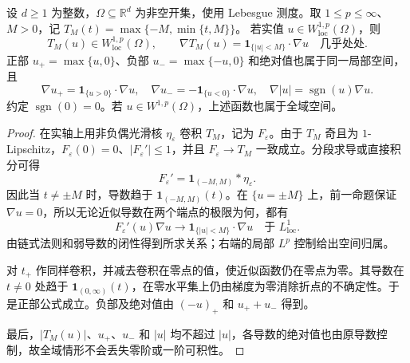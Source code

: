 \begin{proposition}\label{b1:prop:sobolev-truncation}
设 \(d\geq1\) 为整数，\(\Omega\subseteq\mathbb R^d\) 为非空开集，使用 Lebesgue 测度。取 \(1\leq p\leq\infty\)、\(M>0\)，记 \(T_M(t)=\max\{-M,\min\{t,M\}\}\)。
若实值 \(u\in W^{1,p}_{\mathrm{loc}}(\Omega)\)，则
\[
 T_M(u)\in W^{1,p}_{\mathrm{loc}}(\Omega),\qquad
 \nabla T_M(u)=\mathbf1_{\{|u|<M\}}\cdot\nabla u
 \quad\text{几乎处处}.
\]
正部 \(u_+=\max\{u,0\}\)、负部 \(u_-=\max\{-u,0\}\) 和绝对值也属于同一局部空间，且
\[
 \nabla u_+=\mathbf1_{\{u>0\}}\cdot\nabla u,\quad
 \nabla u_-=-\mathbf1_{\{u<0\}}\cdot\nabla u,\quad
 \nabla|u|=\operatorname{sgn}(u)\nabla u.
\]
约定 \(\operatorname{sgn}(0)=0\)。若 \(u\in W^{1,p}(\Omega)\)，上述函数也属于全域空间。
\end{proposition}
\begin{proof}
在实轴上用非负偶光滑核 \(\eta_\varepsilon\) 卷积 \(T_M\)，记为 \(F_\varepsilon\)。由于 \(T_M\) 奇且为 \(1\)-Lipschitz，\(F_\varepsilon(0)=0\)、\(|F_\varepsilon'|\le1\)，并且 \(F_\varepsilon\to T_M\) 一致成立。分段求导或直接积分可得
\[
 F_\varepsilon'=\mathbf1_{(-M,M)}*\eta_\varepsilon.
\]
因此当 \(t\ne\pm M\) 时，导数趋于 \(\mathbf1_{(-M,M)}(t)\)。在 \(\{u=\pm M\}\) 上，前一命题保证 \(\nabla u=0\)，所以无论近似导数在两个端点的极限为何，都有
\[
 F_\varepsilon'(u)\nabla u
 \longrightarrow\mathbf1_{\{|u|<M\}}\cdot\nabla u
 \quad\text{于 }L^1_{\mathrm{loc}}.
\]
由链式法则和弱导数的闭性得到所求关系；右端的局部 \(L^p\) 控制给出空间归属。

对 \(t_+\) 作同样卷积，并减去卷积在零点的值，使近似函数仍在零点为零。其导数在 \(t\ne0\) 处趋于 \(\mathbf1_{(0,\infty)}(t)\)，在零水平集上仍由梯度为零消除折点的不确定性。于是正部公式成立。负部及绝对值由 \((-u)_+\) 和 \(u_++u_-\) 得到。

最后，\(|T_M(u)|\)、\(u_+\)、\(u_-\) 和 \(|u|\) 均不超过 \(|u|\)，各导数的绝对值也由原导数控制，故全域情形不会丢失零阶或一阶可积性。
\end{proof}

